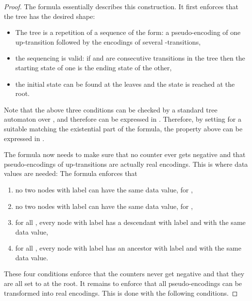 \documentclass{CSML}
\begin{document}
\begin{proof}
The formula  essentially describes this construction. It first enforces
that the tree has the desired shape: 
\begin{itemize}
\item The tree is a repetition of a sequence of the form: a pseudo-encoding 
of one up-transition followed by the encodings of several -transitions,
\item the sequencing is valid: if  and  are consecutive transitions
  in the tree then the starting state of one is the ending state of the other,
\item the initial state  can be found at the leaves 
and the state  is reached at the root.
\end{itemize}
Note that the above three conditions can be checked by a standard tree
automaton over , and therefore can be expressed in .
Therefore, by setting  for a
suitable  matching the existential part of the  formula, 
the property above can be expressed in .

The formula  now needs to make sure that no counter ever gets negative and that
pseudo-encodings of up-transitions are actually real encodings. 
This is where
data values are needed:
The formula  enforces that 
\begin{enumerate}[label=\enspace(\arabic*)]
\item \label{it:Di} no two nodes with label 
      can have the same data value, for ,
\item \label{it:Ii} no two nodes with label 
      can have the same data value, for ,
\item \label{it:DiIi} for all , every node with label  has a descendant 
      with label  and with the same data value,
\item \label{it:IiDi} for all , every node with label  has an ancestor 
      with label  and with the same data value.
\end{enumerate}
These four conditions enforce that the counters never get negative and that
they are all set to  at the root.  It remains to enforce that all
pseudo-encodings can be transformed into real encodings.  
This is done with the following conditions.
\enlargethispage{\baselineskip}


\end{proof}
\end{document}
